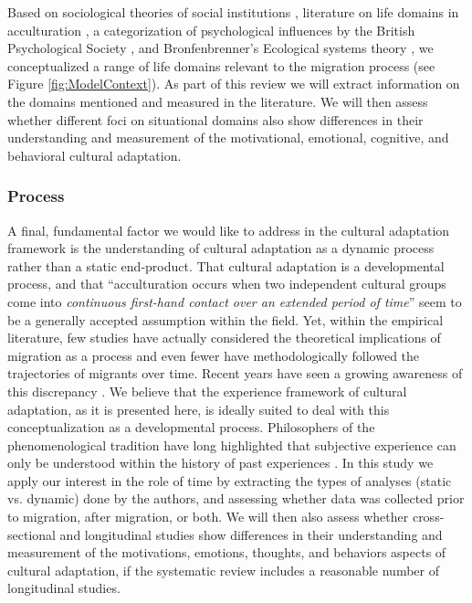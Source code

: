 \documentclass[man, 12pt, a4paper]{apa7}
\begin{document}
Based on sociological theories of social institutions \citep{Durkheim1982}, literature on life domains in acculturation \citep{Arends-Toth2006, Arends-Toth2007, Zane2004}, a categorization of psychological influences by the British Psychological Society \citep{Michie2005a}, and Bronfenbrenner's Ecological systems theory \citep{Bronfenbrenner1992}, we conceptualized a range of life domains relevant to the migration process (see Figure \ref{fig:ModelContext}). As part of this review we will extract information on the domains mentioned and measured in the literature. We will then assess whether different foci on situational domains also show differences in their understanding and measurement of the motivational, emotional, cognitive, and behavioral cultural adaptation.

\subsubsection{Process} 
A final, fundamental factor we would like to address in the cultural adaptation framework is the understanding of cultural adaptation as a dynamic process rather than a static end-product. That cultural adaptation is a developmental process, and that ``acculturation occurs when two independent cultural groups come into \textit{continuous first-hand contact over an extended period of time}'' \citep[][186]{Berry1989} seem to be a generally accepted assumption within the field. Yet, within the empirical literature, few studies have actually considered the theoretical implications of migration as a process and even fewer have methodologically followed the trajectories of migrants over time. Recent years have seen a growing awareness of this discrepancy \citep[e.g.,][]{Brown2011, Ward2019}. We believe that the experience framework of cultural adaptation, as it is presented here, is ideally suited to deal with this conceptualization as a developmental process. Philosophers of the phenomenological tradition have long highlighted that subjective experience can only be understood within the history of past experiences \citep[e.g.,][; also see Figure \ref{fig:ModelContext}]{Heidegger1867}. In this study we apply our interest in the role of time by extracting the types of analyses (static vs. dynamic) done by the authors, and assessing whether data was collected prior to migration, after migration, or both. We will then also assess whether cross-sectional and longitudinal studies show differences in their understanding and measurement of the motivations, emotions, thoughts, and behaviors aspects of cultural adaptation, if the systematic review includes a reasonable number of longitudinal studies.
\end{document}
